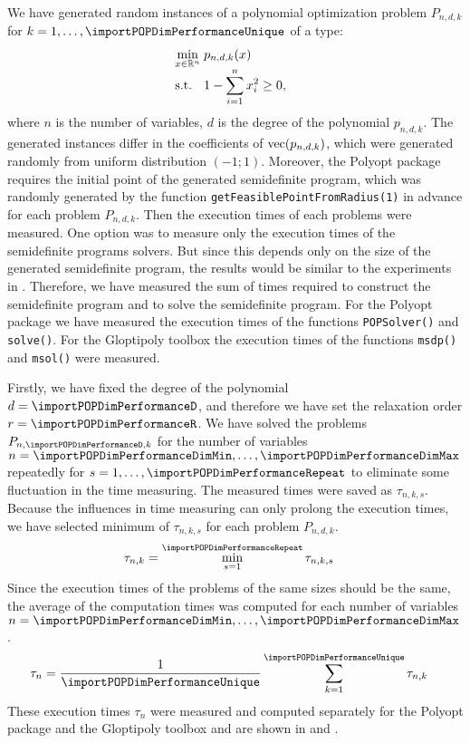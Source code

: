 We have generated random instances of a polynomial optimization problem $P_{n,d,k}$ for $k = 1,\ldots,\importPOPDimPerformanceUnique$ of a type:
\begin{align}
  \arraycolsep=1.4pt
  \begin{array}{rclrcl@{\hskip0.5cm}l}
    && \displaystyle \min_{x\in\R^n} & \multicolumn{3}{l}{\displaystyle p_{n,d,k}(x)}\\
    && \text{s.t.} & \displaystyle 1 - \sum_{i=1}^n x_i^2 &\geq& 0,
  \end{array}
\end{align}
where $n$ is the number of variables, $d$ is the degree of the polynomial $p_{n,d,k}$.
The generated instances differ in the coefficients of $\operatorname{vec}(p_{n,d,k})$, which were generated randomly from uniform distribution $(-1;1)$.
Moreover, the Polyopt package requires the initial point of the generated semidefinite program, which was randomly generated by the function \texttt{getFeasiblePointFromRadius(1)} in advance for each problem $P_{n,d,k}$.
Then the execution times of each problems were measured.
One option was to measure only the execution times of the semidefinite programs solvers. But since this depends only on the size of the generated semidefinite program, the results would be similar to the experiments in .
Therefore, we have measured the sum of times required to construct the semidefinite program and to solve the semidefinite program.
For the Polyopt package we have measured the execution times of the functions \texttt{POPSolver()} and \texttt{solve()}.
For the Gloptipoly toolbox the execution times of the functions \texttt{msdp()} and \texttt{msol()} were measured.

Firstly, we have fixed the degree of the polynomial $d = \importPOPDimPerformanceD$, and therefore we have set the relaxation order $r = \importPOPDimPerformanceR$.
We have solved the problems $P_{n,\importPOPDimPerformanceD,k}$ for the number of variables $n = \importPOPDimPerformanceDimMin, \ldots, \importPOPDimPerformanceDimMax$ repeatedly for $s = 1,\ldots, \importPOPDimPerformanceRepeat$ to eliminate some fluctuation in the time measuring.
The measured times were saved as $\tau_{n,k,s}$.
Because the influences in time measuring can only prolong the execution times, we have selected minimum of $\tau_{n,k,s}$ for each problem $P_{n,d,k}$.
\begin{align}
  \tau_{n,k} &= \min_{s=1}^{\importPOPDimPerformanceRepeat} \tau_{n,k,s}
\end{align}
Since the execution times of the problems of the same sizes should be the same, the average of the computation times was computed for each number of variables $n = \importPOPDimPerformanceDimMin, \ldots, \importPOPDimPerformanceDimMax$.
\begin{align}
  \tau_n &= \frac{1}{\importPOPDimPerformanceUnique}\sum_{k=1}^{\importPOPDimPerformanceUnique} \tau_{n,k}
\end{align}
These execution times $\tau_n$ were measured and computed separately for the Polyopt package and the Gloptipoly toolbox and are shown in  and .

